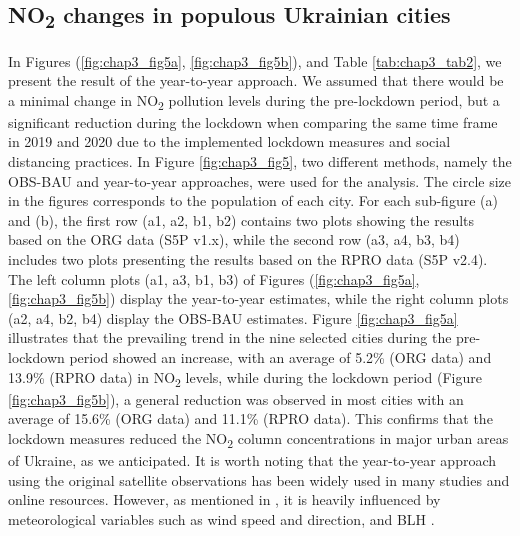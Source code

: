 \subsection{NO\textsubscript{2} changes in populous Ukrainian cities}
In Figures (\ref{fig:chap3_fig5a}, \ref{fig:chap3_fig5b}), and Table \ref{tab:chap3_tab2}, we present the result of the year-to-year approach. We assumed that there would be a minimal change in NO\textsubscript{2} pollution levels during the pre-lockdown period, but a significant reduction during the lockdown when comparing the same time frame in 2019 and 2020 due to the implemented lockdown measures and social distancing practices. In Figure \ref{fig:chap3_fig5}, two different methods, namely the OBS-BAU and year-to-year approaches, were used for the analysis. The circle size in the figures corresponds to the population of each city. For each sub-figure (a) and (b), the first row (a1, a2, b1, b2) contains two plots showing the results based on the ORG data (S5P v1.x), while the second row (a3, a4, b3, b4) includes two plots presenting the results based on the RPRO data (S5P v2.4). The left column plots (a1, a3, b1, b3) of Figures (\ref{fig:chap3_fig5a}, \ref{fig:chap3_fig5b}) display the year-to-year estimates, while the right column plots (a2, a4, b2, b4) display the OBS-BAU estimates. Figure \ref{fig:chap3_fig5a} illustrates that the prevailing trend in the nine selected cities during the pre-lockdown period showed an increase, with an average of 5.2\% (ORG data) and 13.9\% (RPRO data) in NO\textsubscript{2} levels, while during the lockdown period (Figure \ref{fig:chap3_fig5b}), a general reduction was observed in most cities with an average of 15.6\% (ORG data) and 11.1\% (RPRO data). This confirms that the lockdown measures reduced the NO\textsubscript{2} column concentrations in major urban areas of Ukraine, as we anticipated. It is worth noting that the year-to-year approach using the original satellite observations has been widely used in many studies and online resources. However, as mentioned in \citep{barre2021estimating,grange2021covid}, it is heavily influenced by meteorological variables such as wind speed and direction, and BLH \citep{wallace2009effect}.\par

